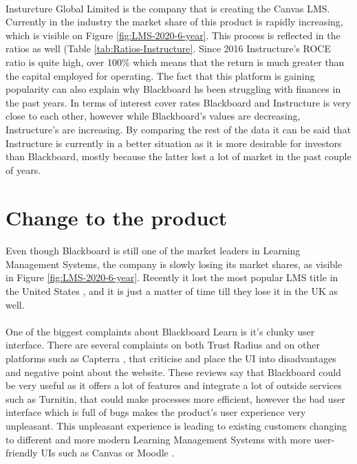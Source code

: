 \documentclass[]{article}
\begin{document}
\paragraph{}
Insturcture Global Limited is the company that is creating the Canvas LMS. Currently in the industry the market share of this product is rapidly increasing, which is visible on Figure \ref{fig:LMS-2020-6-year}. This process is reflected in the ratios as well (Table \ref{tab:Ratios-Instructure}. Since 2016 Instructure's ROCE ratio is quite high, over 100\% which means that the return is much greater than the capital employed for operating. The fact that this platform is gaining popularity can also explain why Blackboard hs been struggling with finances in the past years. In terms of interest cover rates Blackboard and Instructure is very close to each other, however while Blackboard's values are decreasing, Instructure's are increasing. By comparing the rest of the data it can be said that Instructure is currently in a better situation as it is more desirable for investors than Blackboard, mostly because the latter lost a lot of market in the past couple of years. 

\section{Change to the product}

\paragraph{}
Even though Blackboard is still one of the market leaders in Learning Management Systems, the company is slowly losing its market shares, as visible in Figure \ref{fig:LMS-2020-6-year}. Recently it lost the most popular LMS title in the United States \cite{Canvas-overtakes-BB}, and it is just a matter of time till they lose it in the UK as well. 

\paragraph{}
One of the biggest complaints about Blackboard Learn is it's clunky user interface. There are several complaints on both Trust Radius \cite{BB-Reviews} and on other platforms such as Capterra \cite{Capterra-BB-Reviews}, that criticise and place the UI into disadvantages and negative point about the website. These reviews say that Blackboard could be very useful as it offers a lot of features and integrate a lot of outside services such as Turnitin, that could make processes more efficient, however the bad user interface which is full of bugs makes the product's user experience very unpleasant. This unpleasant experience is leading to existing customers changing to different and more modern Learning Management Systems with more user-friendly UIs such as Canvas or Moodle \cite{BB-Alternatives}.
\end{document}
